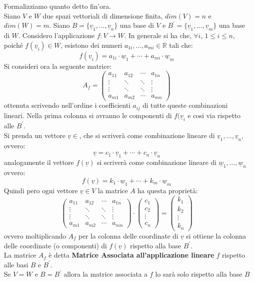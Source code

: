 \documentclass[a4paper,12pt, oneside]{book}
\begin{document}
\begin{definizione}
Formalizziamo quanto detto fin'ora.\\
Siano $V$ e $W$ due spazi vettoriali di dimensione finita, $dim (V)=n$ e $dim(W)=m$. Siano $B=\{\underline{v}_1,...,\underline{v}_n\}$ una base di $V$ e $B^{'}=\{\underline{v}_1,...,\underline{v}_m\}$ una base di $W$. Considero l'applicazione $f:V\to W$. In generale si ha che, $\forall i,\, 1\leq i\leq n$, poiché $f(\underline{v}_i)\in W$, esistono dei numeri $a_{1i},...,a_{mi}\in \mathbb{R}$ tali che:
$$f(\underline{v}_i)=a_{1i}\cdot \underline{w}_1+\cdots+a_{mi}\cdot \underline{w}_m$$
Si consideri ora la seguente matrice:
$$
A_f=\left(\begin{matrix}
a_{11} & a_{12} & \cdots & a_{1n}\\
\vdots & \ddots & \ddots & \vdots\\
\vdots & \ddots & \ddots & \vdots\\
a_{m1} & a_{m2} & \cdots & a_{mn}
\end{matrix}\right)
$$
ottenuta scrivendo nell'ordine i coefficienti $a_{ij}$ di tutte queste combinazioni lineari. Nella prima colonna si avranno le componenti di $f(\underline{v}_i$ e cosi via rispetto alle $B^{'}$.\\
Si prenda un vettore $\underline{v}\in $, che si scriverà come combinazione lineare di $\underline{v}_1,...,\underline{v}_n $, ovvero:
$$\underline{v}=c_1\cdot \underline{v}_1+\cdots +c_n\cdot\underline{v}_n$$
analogamente il vettore $f(\underline{v})$ si scriverà come combinazione lineare di $\underline{w}_1,...,\underline{w}_n $ ovvero:
$$f(\underline{v})=k_1\cdot \underline{w}_1+\cdots+k_m\cdot \underline{w}_m$$
Quindi pero ogni vettore $\underline{v}\in V$ la matrice $A$ ha questa proprietà:
$$
\left(\begin{matrix}
a_{11} & a_{12} & \cdots & a_{1n}\\
\vdots & \ddots & \ddots & \vdots\\
\vdots & \ddots & \ddots & \vdots\\
a_{m1} & a_{m2} & \cdots & a_{mn}
\end{matrix}\right)\cdot\left(\begin{matrix}
c_1\\
c_2\\
\vdots\\
c_n
\end{matrix}\right)=\left(\begin{matrix}
k_1\\
k_2\\
\vdots\\
k_n
\end{matrix}\right)
$$
ovvero moltiplicando $A_f$ per la colonna delle coordinate di $\underline{v}$ si ottiene la colonna delle coordinate (o componenti) di $f(\underline{v})$ rispetto alla base $B^{'}$. \\
La matrice $A_f$ è detta \textbf{Matrice Associata all'applicazione lineare} $f$ rispetto alle basi $B$ e $B^{'}$.\\
Se $V=W $ e $B=B^{'}$ allora la matrice associata a $f$ lo sarà solo rispetto alla base $B$
\end{definizione}
\newpage
\end{document}
